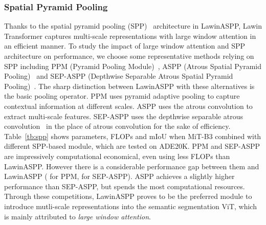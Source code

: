 \documentclass[10pt,twocolumn,letterpaper]{article}
\begin{document}
\subsubsection{Spatial Pyramid Pooling}
Thanks to the spatial pyramid pooling (SPP)~\cite{lazebnik2006beyond, grauman2005pyramid} architecture in LawinASPP, Lawin Transformer captures multi-scale representations with large window attention in an efficient manner. To study the impact of large window attention and SPP architecture on performance, we choose some representative methods relying on SPP including PPM (Pyramid Pooling Module)~\cite{zhao2017pyramid}, ASPP (Atrous Spatial Pyramid Pooling)~\cite{chen2017rethinking} and SEP-ASPP (Depthwise Separable Atrous Spatial Pyramid Pooling)~\cite{chen2018encoder}. The sharp distinction between LawinASPP with these alternatives is the basic pooling operator. PPM uses pyramid adaptive pooling to capture contextual information at different scales. ASPP uses the atrous convolution to extract multi-scale features. SEP-ASPP uses the depthwise separable atrous convolution~\cite{chollet2017xception} in the place of atrous convolution for the sake of efficiency. Table~\ref{tb:spp} shows parameters, FLOPs and mIoU when MiT-B3 combined with different SPP-based module, which are tested on ADE20K. PPM and SEP-ASPP 
are impressively computational economical, even using less FLOPs than LawinASPP. However there is a considerable performance gap between them and LawinASPP ( for PPM,  for SEP-ASPP). ASPP achieves a slightly higher performance than SEP-ASPP, but spends the most computational resources. Through these competitions, LawinASPP proves to be the preferred module to introduce mutli-scale representations into the semantic segmentation ViT, which is mainly attributed to \textit{large window attention}.
\end{document}
